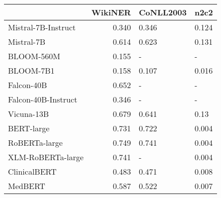 \begin{tabular}{lrll}
\toprule
{} &  WikiNER & CoNLL2003 &   n2c2 \\
\midrule
Mistral-7B-Instruct &    0.340 &     0.346 &  0.124 \\
Mistral-7B          &    0.614 &     0.623 &  0.131 \\
BLOOM-560M          &    0.155 &         - &      - \\
BLOOM-7B1           &    0.158 &     0.107 &  0.016 \\
Falcon-40B          &    0.652 &         - &      - \\
Falcon-40B-Instruct &    0.346 &         - &      - \\
Vicuna-13B          &    0.679 &     0.641 &   0.13 \\
BERT-large          &    0.731 &     0.722 &  0.004 \\
RoBERTa-large       &    0.749 &     0.741 &  0.004 \\
XLM-RoBERTa-large   &    0.741 &         - &  0.004 \\
ClinicalBERT        &    0.483 &     0.471 &  0.008 \\
MedBERT             &    0.587 &     0.522 &  0.007 \\
\bottomrule
\end{tabular}
